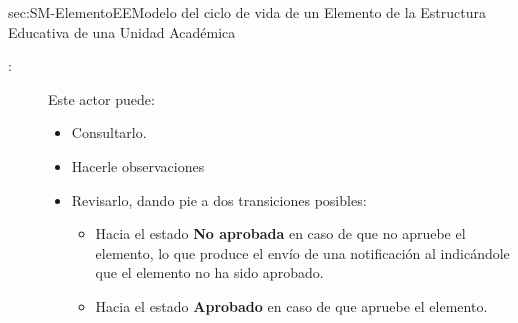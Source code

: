\begin{Maquina}{sec:SM-ElementoEE}{Modelo del ciclo de vida de un Elemento de la Estructura Educativa de una Unidad Académica}
\begin{description}
\begin{description}
		\item[:] Este actor puede:
		\begin{itemize} 
			\item Consultarlo.
			\item Hacerle observaciones
			\item Revisarlo, dando pie a dos transiciones posibles:
			\begin{itemize} 
				\item Hacia el estado {\bf No aprobada} en caso de que no apruebe el elemento, lo que produce el envío de una notificación al  indicándole que el elemento no ha sido aprobado.
				\item Hacia el estado {\bf Aprobado} en caso de que apruebe el elemento.
			\end{itemize}
		\end{itemize}
	
	\end{description}

%	
%	
%	



\end{description}
\end{Maquina}
